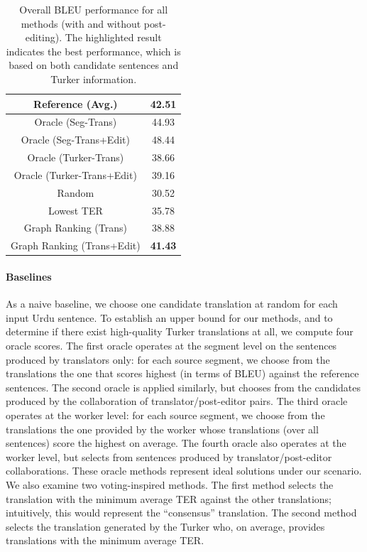 \documentclass[11pt]{article}
\begin{document}
\begin{table}[t]
\centering
\begin{tabular}{|c||c|} \hline
Reference (Avg.)   &42.51        \\   \hline
Oracle (Seg-Trans)  &44.93	          \\  \hline
Oracle (Seg-Trans+Edit)  &48.44	          \\  \hline
Oracle (Turker-Trans)    &38.66 \\ \hline
Oracle (Turker-Trans+Edit)    &39.16 \\ \hline \hline
Random &30.52  	           \\ \hline
Lowest TER   &35.78  \\  \hline
Graph Ranking (Trans)   &38.88  \\  \hline
Graph Ranking (Trans+Edit)   &\textbf{41.43}  \\  \hline
\end{tabular}
\caption{Overall BLEU performance for all methods (with and without post-editing). The highlighted result indicates the best performance, which is based on both candidate sentences and Turker information.}
\label{summary-results}
\end{table}

\paragraph{Baselines}

As a naive baseline, we choose one candidate translation at random for each input Urdu sentence. To establish an upper bound for our methods, and to determine if there exist high-quality Turker translations at all, we compute four oracle scores. The first oracle operates at the segment level on the sentences produced by translators only: for each source segment, we choose from the translations the one that scores highest (in terms of BLEU) against the reference sentences. The second oracle is applied similarly, but chooses from the candidates produced by the collaboration of translator/post-editor pairs. The third oracle operates at the worker level: for each source segment, we choose from the translations the one provided by the worker whose translations (over all sentences) score the highest on average. The fourth oracle also operates at the worker level, but selects from sentences produced by translator/post-editor collaborations. These oracle methods represent ideal solutions under our scenario. We also examine two voting-inspired methods. The first method selects the translation with the minimum average TER \cite{a18} against the other translations; intuitively, this would represent the ``consensus'' translation. The second method selects the translation generated by the Turker who, on average, provides translations with the minimum average TER.
\end{document}
